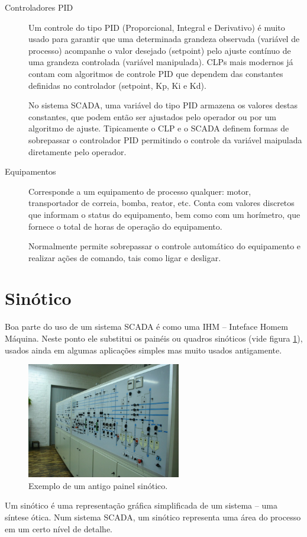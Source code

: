 \begin{description}
	\item[Controladores PID] Um controle do tipo PID (Proporcional, Integral e Derivativo) é muito usado para garantir que uma determinada grandeza observada (variável de processo) acompanhe o valor desejado (setpoint) pelo ajuste contínuo de uma grandeza controlada (variável manipulada). CLPs mais modernos já contam com algoritmos de controle PID que dependem das constantes definidas no controlador (setpoint, Kp, Ki e Kd).

	No sistema SCADA, uma variável do tipo PID armazena os valores destas constantes, que podem então ser ajustados pelo operador ou por um algoritmo de ajuste. Tipicamente o CLP e o SCADA definem formas de sobrepassar o controlador PID permitindo o controle da variável maipulada diretamente pelo operador.
	\item[Equipamentos] Corresponde a um equipamento de processo qualquer: motor, transportador de correia, bomba, reator, etc. Conta com valores discretos que informam o status do equipamento, bem como com um horímetro, que fornece o total de horas de operação do equipamento.

	Normalmente permite sobrepassar o controle automático do equipamento e realizar ações de comando, tais como ligar e desligar.
\end{description}

\section{Sinótico}
Boa parte do uso de um sistema SCADA é como uma IHM -- Inteface Homem Máquina. Neste ponto ele substitui os painéis ou quadros sinóticos (vide figura \ref{fig:painel_sinotico}), usados ainda em algumas aplicações simples mas muito usados antigamente.


\begin{figure}[hb]
	\centering
	\includegraphics[width=0.6\textwidth]{figuras/painel_sinotico}
	\caption{Exemplo de um antigo painel sinótico.}\label{fig:painel_sinotico}
\end{figure}
Um sinótico é uma representação gráfica simplificada de um sistema -- uma síntese ótica. Num sistema SCADA, um sinótico representa uma área do processo em um certo nível de detalhe.

